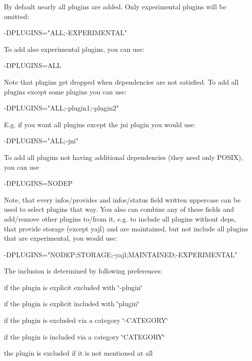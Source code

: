 By default nearly all plugins are added. Only experimental plugins will be omitted\+: \begin{DoxyVerb}    -DPLUGINS="ALL;-EXPERIMENTAL"
\end{DoxyVerb}


To add also experimental plugins, you can use\+: \begin{DoxyVerb}    -DPLUGINS=ALL
\end{DoxyVerb}


Note that plugins get dropped when dependencies are not satisfied. To add all plugins except some plugins you can use\+: \begin{DoxyVerb}    -DPLUGINS="ALL;-plugin1;-plugin2"
\end{DoxyVerb}


E.\+g. if you want all plugins except the jni plugin you would use\+: \begin{DoxyVerb}    -DPLUGINS="ALL;-jni"
\end{DoxyVerb}


To add all plugins not having additional dependencies (they need only P\+O\+S\+I\+X), you can use \begin{DoxyVerb}    -DPLUGINS=NODEP
\end{DoxyVerb}


Note, that every {\ttfamily infos/provides} and {\ttfamily infos/status} field written uppercase can be used to select plugins that way. You also can combine any of these fields and add/remove other plugins to/from it, e.\+g. to include all plugins without deps, that provide storage (except yajl) and are maintained, but not include all plugins that are experimental, you would use\+: \begin{DoxyVerb}    -DPLUGINS="NODEP;STORAGE;-yajl;MAINTAINED;-EXPERIMENTAL"
\end{DoxyVerb}


The inclusion is determined by following preferences\+:


\begin{DoxyEnumerate}
\item if the plugin is explicit excluded with \char`\"{}-\/plugin\char`\"{}
\item if the plugin is explicit included with \char`\"{}plugin\char`\"{}
\item if the plugin is excluded via a category \char`\"{}-\/\+C\+A\+T\+E\+G\+O\+R\+Y\char`\"{}
\item if the plugin is included via a category \char`\"{}\+C\+A\+T\+E\+G\+O\+R\+Y\char`\"{}
\item the plugin is excluded if it is not mentioned at all
\end{DoxyEnumerate}

